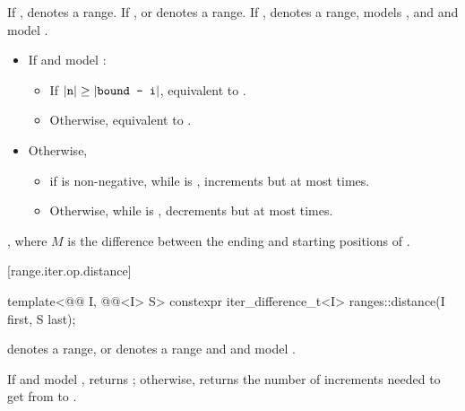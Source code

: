 \begin{itemdescr}
\pnum
\expects
If ,  denotes a range.
If ,  or  denotes a range.
If ,  denotes a range,
 models , and
 and  model .

\pnum
\effects
\begin{itemize}
\item If  and  model :
  \begin{itemize}
  \item If \brk{}$|\texttt{n}| \ge |\texttt{bound - i}|$,
    equivalent to .
  \item Otherwise, equivalent to .
  \end{itemize}
\item Otherwise,
  \begin{itemize}
  \item if  is non-negative,
    while  is ,
    increments  but at most  times.
  \item Otherwise,
    while  is ,
    decrements  but at most  times.
  \end{itemize}
\end{itemize}

\pnum
\returns
{}, where $M$ is the difference between
the ending and starting positions of .
\end{itemdescr}

[range.iter.op.distance]{}
%
\begin{itemdecl}
template<@@ I, @@<I> S>
  constexpr iter_difference_t<I> ranges::distance(I first, S last);
\end{itemdecl}

\begin{itemdescr}
\pnum
\expects
{} denotes a range, or
 denotes a range and
 and  model
.

\pnum
\effects
If  and  model ,
returns ;
otherwise, returns the number of increments needed to get from
to
.
\end{itemdescr}

